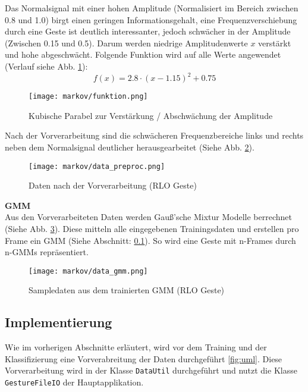 Das Normalsignal mit einer hohen Amplitude (Normalisiert im Bereich zwischen 0.8 und 1.0) birgt einen geringen Informationsgehalt, 
eine Frequenzverschiebung durch eine Geste ist deutlich interessanter, jedoch schwächer in der Amplitude (Zwischen 0.15 und 0.5).
Darum werden niedrige Amplitudenwerte \( x \) verstärkt und hohe abgeschwächt. 
Folgende Funktion wird auf alle Werte angewendet  (Verlauf siehe Abb. \ref{fig:funktion}): \\
\[ f(x) = 2.8 \cdot ( x - 1.15 )^2 + 0.75 \]
\begin{figure}[htbp] \centering
    \texttt{[image: markov/funktion.png]}
    \caption{Kubische Parabel zur Verstärkung / Abschwächung der Amplitude}
    \label{fig:funktion}
\end{figure}

Nach der Vorverarbeitung sind die schwächeren Frequenzbereiche links und rechts neben dem Normalsignal deutlicher 
herausgearbeitet (Siehe Abb. \ref{fig:data_preproc}).  

\begin{figure}[htbp] \centering
    \texttt{[image: markov/data\_preproc.png]}
    \caption{Daten nach der Vorverarbeitung (\acl{RLO} Geste)}
    \label{fig:data_preproc}
\end{figure}

\textbf{\acl{GMM}} \\
Aus den Vorverarbeiteten Daten werden Gauß’sche Mixtur Modelle berrechnet (Siehe Abb. \ref{fig:data_gmm}). 
Diese mitteln alle eingegebenen Trainingsdaten und erstellen pro Frame ein \acl{GMM} (Siehe Abschnitt: 
\ref{sec:impl}). So wird eine Geste mit n-Frames durch n-\acl{GMM}s repräsentiert.

\begin{figure}[htbp] \centering
    \texttt{[image: markov/data\_gmm.png]}
    \caption{Sampledaten aus dem trainierten \acl{GMM} (\acl{RLO} Geste)}
    \label{fig:data_gmm}
\end{figure}


\subsection{Implementierung}  \label{sec:impl}
Wie im vorherigen Abschnitte erläutert, wird vor dem Training und der Klassifizierung eine Vorverabreitung der Daten durchgeführt \ref{fig:uml}.
Diese Vorverarbeitung wird in der Klasse \texttt{DataUtil} durchgeführt und nutzt die Klasse \texttt{GestureFileIO} der Hauptapplikation.

